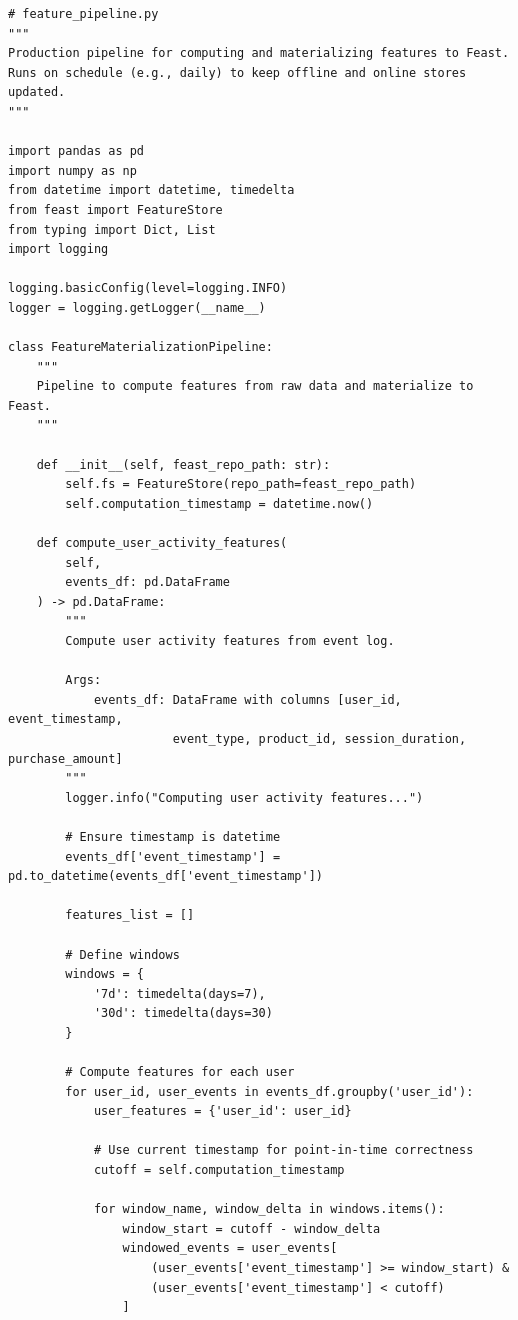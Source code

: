 \begin{lstlisting}[style=python, caption=Production feature materialization pipeline]
# feature_pipeline.py
"""
Production pipeline for computing and materializing features to Feast.
Runs on schedule (e.g., daily) to keep offline and online stores updated.
"""

import pandas as pd
import numpy as np
from datetime import datetime, timedelta
from feast import FeatureStore
from typing import Dict, List
import logging

logging.basicConfig(level=logging.INFO)
logger = logging.getLogger(__name__)

class FeatureMaterializationPipeline:
    """
    Pipeline to compute features from raw data and materialize to Feast.
    """

    def __init__(self, feast_repo_path: str):
        self.fs = FeatureStore(repo_path=feast_repo_path)
        self.computation_timestamp = datetime.now()

    def compute_user_activity_features(
        self,
        events_df: pd.DataFrame
    ) -> pd.DataFrame:
        """
        Compute user activity features from event log.

        Args:
            events_df: DataFrame with columns [user_id, event_timestamp,
                       event_type, product_id, session_duration, purchase_amount]
        """
        logger.info("Computing user activity features...")

        # Ensure timestamp is datetime
        events_df['event_timestamp'] = pd.to_datetime(events_df['event_timestamp'])

        features_list = []

        # Define windows
        windows = {
            '7d': timedelta(days=7),
            '30d': timedelta(days=30)
        }

        # Compute features for each user
        for user_id, user_events in events_df.groupby('user_id'):
            user_features = {'user_id': user_id}

            # Use current timestamp for point-in-time correctness
            cutoff = self.computation_timestamp

            for window_name, window_delta in windows.items():
                window_start = cutoff - window_delta
                windowed_events = user_events[
                    (user_events['event_timestamp'] >= window_start) &
                    (user_events['event_timestamp'] < cutoff)
                ]


\end{lstlisting}
